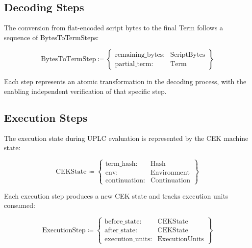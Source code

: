 \documentclass[../midgard.tex]{subfiles}
\begin{document}
\subsection{Decoding Steps}

The conversion from flat-encoded script bytes to the final Term follows a sequence of BytesToTermSteps:

\begin{equation*}
    \text{BytesToTermStep} \coloneq \left\{
    \begin{array}{ll}
        \text{remaining\_bytes} : & \text{ScriptBytes} \\
        \text{partial\_term} : & \text{Term}
    \end{array} \right\}
\end{equation*}

Each step represents an atomic transformation in the decoding process, with the  enabling independent verification of that specific step.

\subsection{Execution Steps}

The execution state during UPLC evaluation is represented by the CEK machine state:

\begin{equation*}
    \text{CEKState} \coloneq \left\{
    \begin{array}{ll}
        \text{term\_hash} : & \text{Hash} \\
        \text{env} : & \text{Environment} \\
        \text{continuation} : & \text{Continuation}
    \end{array} \right\}
\end{equation*}

Each execution step produces a new CEK state and tracks execution units consumed:

\begin{equation*}
    \text{ExecutionStep} \coloneq \left\{
    \begin{array}{ll}
        \text{before\_state} : & \text{CEKState} \\
        \text{after\_state} : & \text{CEKState} \\
        \text{execution\_units} : & \text{ExecutionUnits}
    \end{array} \right\}
\end{equation*}
\end{document}
